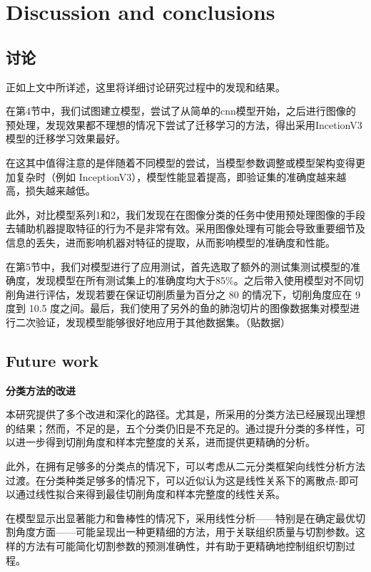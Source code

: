 \section{Discussion and conclusions}
\label{sec:results}

\subsection{讨论}


正如上文中所详述，这里将详细讨论研究过程中的发现和结果。

在第4节中，我们试图建立模型，尝试了从简单的cnn模型开始，之后进行图像的预处理，发现效果都不理想的情况下尝试了迁移学习的方法，得出采用IncetionV3模型的迁移学习效果最好。


在这其中值得注意的是伴随着不同模型的尝试，当模型参数调整或模型架构变得更加复杂时（例如 InceptionV3），模型性能显着提高，即验证集的准确度越来越高，损失越来越低。

此外，对比模型系列1和2，我们发现在在图像分类的任务中使用预处理图像的手段去辅助机器提取特征的行为不是非常有效。采用图像处理有可能会导致重要细节及信息的丢失，进而影响机器对特征的提取，从而影响模型的准确度和性能。

在第5节中，我们对模型进行了应用测试，首先选取了额外的测试集测试模型的准确度，发现模型在所有测试集上的准确度均大于85\%。之后带入使用模型对不同切削角进行评估，发现若要在保证切削质量为百分之 80 的情况下，切削角度应在 9 度到 10.5 度之间。最后，我们使用了另外的鱼的肺泡切片的图像数据集对模型进行二次验证，发现模型能够很好地应用于其他数据集。（贴数据）


\subsection{Future work}

\textbf{分类方法的改进}

本研究提供了多个改进和深化的路径。尤其是，所采用的分类方法已经展现出理想的结果；然而，不足的是，五个分类仍旧是不充足的。通过提升分类的多样性，可以进一步得到切削角度和样本完整度的关系，进而提供更精确的分析。

此外，在拥有足够多的分类点的情况下，可以考虑从二元分类框架向线性分析方法过渡。在分类种类足够多的情况下，可以近似认为这是线性关系下的离散点-即可以通过线性拟合来得到最佳切削角度和样本完整度的线性关系。

在模型显示出显著能力和鲁棒性的情况下，采用线性分析——特别是在确定最优切割角度方面——可能呈现出一种更精细的方法，用于关联组织质量与切割参数。这样的方法有可能简化切割参数的预测准确性，并有助于更精确地控制组织切割过程。

